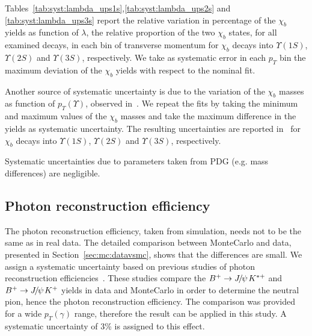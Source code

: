 Tables~\ref{tab:syst:lambda_ups1s},\ref{tab:syst:lambda_ups2s} and
\ref{tab:syst:lambda_ups3s} report the relative variation in percentage of the
$\chi_b$ yields as function of $\lambda$, the relative proportion of the two
$\chi_b$ states, for all examined decays, in each bin of transverse momentum
for $\chi_b$ decays into $\Upsilon(1S)$, $\Upsilon(2S)$ and $\Upsilon(3S)$,
respectively. We take as systematic error in each $p_T$ bin the maximum
deviation of the $\chi_b$ yields with respect to the nominal fit.

Another source of systematic uncertainty is due to the variation of the $\chi_b$ masses as
function of $p_T(\Upsilon)$, observed in~. We repeat the fits by
taking the minimum and maximum values of the $\chi_b$ masses and take the
maximum difference in the yields as systematic uncertainty. The resulting
uncertainties are reported
in~ for $\chi_b$
decays into $\Upsilon(1S)$, $\Upsilon(2S)$ and $\Upsilon(3S)$, respectively.
 
Systematic uncertainties due to parameters taken from PDG (e.g. mass differences)
are negligible.
 
 





\subsection{Photon reconstruction efficiency}
The photon reconstruction efficiency, taken from simulation, needs not to be
the same as in real data. The detailed comparison between MonteCarlo and data,
presented in Section~\ref{sec:mc:datavsmc}, shows that the differences are
small. We assign a systematic uncertainty based on previous studies of photon
reconstruction efficiencies~\cite{Belyaev:1411344}. These studies compare the
$B^+ \rightarrow {\ensuremath{{J\mskip -3mu/\mskip -2mu\psi\mskip 2mu}}} K^{*+}$ and $B^+ \rightarrow {\ensuremath{{J\mskip -3mu/\mskip -2mu\psi\mskip 2mu}}} K^+$ yields in data and MonteCarlo in
order to determine the neutral pion, hence the photon  reconstruction
efficiency. The comparison was provided for a wide $p_T(\gamma)$ range, therefore
the result can be applied in this study. A systematic uncertainty of 3\%
is assigned to this effect.


